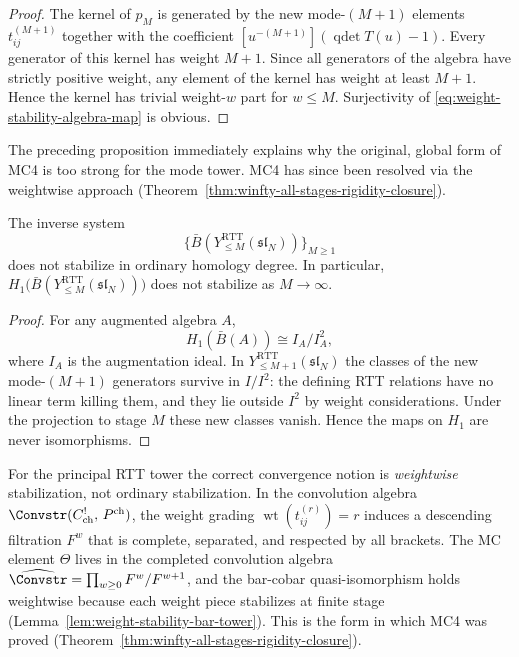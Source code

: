 \begin{proof}
The kernel of $p_M$ is generated by the new mode-$(M+1)$ elements
$t^{(M+1)}_{ij}$ together with the coefficient
$[u^{-(M+1)}](\operatorname{qdet}T(u)-1)$.  Every generator of this kernel
has weight $M+1$.  Since all generators of the algebra have strictly
positive weight, any element of the kernel has weight at least $M+1$.
Hence the kernel has trivial weight-$w$ part for $w\le M$.  Surjectivity
of \eqref{eq:weight-stability-algebra-map} is obvious.
\end{proof}

The preceding proposition immediately explains why the original, global
form of MC4 is too strong for the mode tower.  MC4 has since been
resolved via the weightwise approach
(Theorem~\ref{thm:winfty-all-stages-rigidity-closure}).

\begin{proposition}
\ClaimStatusProvedHere
\label{prop:failure-unweighted-stabilization}
The inverse system
\begin{equation}
\{\bar B(Y^{\mathrm{RTT}}_{\le M}(\mathfrak{sl}_N))\}_{M\ge 1}
\end{equation}
does not stabilize in ordinary homology degree.  In particular,
$H_1\big(\bar B(Y^{\mathrm{RTT}}_{\le M}(\mathfrak{sl}_N))\big)$ does not
stabilize as $M\to\infty$.
\end{proposition}

\begin{proof}
For any augmented algebra $A$,
\begin{equation}
H_1(\bar B(A))\cong I_A/I_A^2,
\end{equation}
where $I_A$ is the augmentation ideal.  In
$Y^{\mathrm{RTT}}_{\le M+1}(\mathfrak{sl}_N)$ the classes of the new
mode-$(M+1)$ generators survive in $I/I^2$: the defining RTT relations
have no linear term killing them, and they lie outside $I^2$ by weight
considerations.  Under the projection to stage $M$ these new classes
vanish.  Hence the maps on $H_1$ are never isomorphisms.
\end{proof}

\begin{remark}
\label{rem:correct-form-of-MC4}
For the principal RTT tower the correct convergence notion is
\emph{weightwise} stabilization, not ordinary stabilization.
In the convolution algebra $\Convstr(C^!_{\mathrm{ch}},\,
P^{\mathrm{ch}})$, the weight grading $\operatorname{wt}(t^{(r)}_{ij})
= r$ induces a descending filtration $F^w$ that is complete,
separated, and respected by all brackets.  The MC element $\Theta$
lives in the completed convolution algebra
$\widehat{\Convstr} = \prod_{w \ge 0} F^w / F^{w+1}$, and the
bar-cobar quasi-isomorphism holds weightwise because each weight
piece stabilizes at finite stage (Lemma~\ref{lem:weight-stability-bar-tower}).
This is the form in which MC4 was proved
(Theorem~\ref{thm:winfty-all-stages-rigidity-closure}).
\end{remark}

